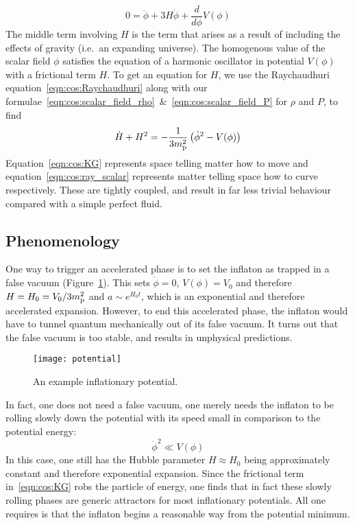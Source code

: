 \begin{equation}
  0 = \ddot{\phi} + 3 H \dot{\phi} + \frac{d}{d\phi}V(\phi)
  \label{eqn:cos:KG}
\end{equation}
The middle term involving $H$ is the term that arises as a result of including the effects of gravity (i.e.\ an expanding universe). The homogenous value of the scalar field $\phi$ satisfies the equation of a harmonic oscillator in potential $V(\phi)$ with a frictional term $H$.
To get an equation for $H$, we use the Raychaudhuri equation~\eqref{eqn:cos:Raychaudhuri} along with our formulae~\eqref{eqn:cos:scalar_field_rho}~\&~\eqref{eqn:cos:scalar_field_P} for $\rho$ and $P$, to find
\begin{equation}
  \dot{H}+H^2 = -\frac{1}{3m_{\mathrm{p}}^2}\left(\dot{\phi}^2-V(\phi)\right)
  \label{eqn:cos:ray_scalar}
\end{equation}
Equation~\eqref{eqn:cos:KG} represents space telling matter how to move and equation~\eqref{eqn:cos:ray_scalar} represents matter telling space how to curve respectively. These are tightly coupled, and result in far less trivial behaviour compared with a simple perfect fluid.


\subsection{Phenomenology}
One way to trigger an accelerated phase is to set the inflaton as trapped in a false vacuum (Figure~\ref{fig:cos:potential}). This sets $\dot{\phi}=0$, $V(\phi)=V_0$ and therefore $H=H_0=V_0/3m_{\mathrm{p}}^2$ and $a\sim e^{H_0t}$, which is an exponential and therefore accelerated expansion. However, to end this accelerated phase, the inflaton would have to tunnel quantum mechanically out of its false vacuum. It turns out that the false vacuum is too stable, and results in unphysical predictions.

\begin{figure}
  \centering
  \texttt{[image: potential]}
  \caption{An example inflationary potential.}
  \label{fig:cos:potential}
\end{figure}

In fact, one does not need a false vacuum, one merely needs the inflaton to be rolling slowly down the potential with its speed small in comparison to the potential energy:
\begin{equation}
  \dot{\phi}^2 \ll V(\phi)
  \label{eqn:cos:slow_roll}
\end{equation}
In this case, one still has the Hubble parameter $H\approx H_0$ being approximately constant and therefore exponential expansion. Since the frictional term in~\eqref{eqn:cos:KG} robs the particle of energy, one finds that in fact these slowly rolling phases are generic attractors for most inflationary potentials. All one requires is that the inflaton begins a reasonable way from the potential minimum.

